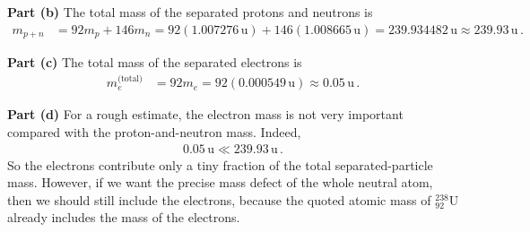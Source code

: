 \documentclass[11pt]{article}
\begin{document}
\noindent\textbf{Part (b)} The total mass of the separated protons and neutrons is
\begin{align*}
m_{p+n} &= 92m_p + 146m_n= 92(1.007276\,\text{u}) + 146(1.008665\,\text{u})= 239.934482\,\text{u} \approx 239.93\,\text{u}\,.
\end{align*}


\noindent\textbf{Part (c)} The total mass of the separated electrons is
\begin{align*}
m_e^{\text{(total)}} &= 92m_e= 92(0.000549\,\text{u})\approx 0.05\,\text{u}\,.
\end{align*}

\noindent\textbf{Part (d)} For a rough estimate, the electron mass is not very important compared with the proton-and-neutron mass. Indeed,
\begin{align*}
0.05\,\text{u} \ll 239.93\,\text{u}\,.
\end{align*}
So the electrons contribute only a tiny fraction of the total separated-particle mass. However, if we want the precise mass defect of the whole neutral atom, then we should still include the electrons, because the quoted atomic mass of $^{238}_{92}\text{U}$ already includes the mass of the electrons.\\
\end{document}

